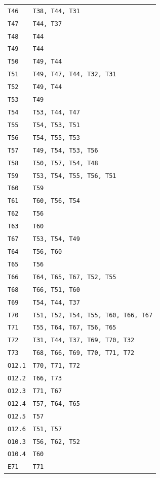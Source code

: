 \begin{longtable}{@{}p{14mm}p{108mm}@{}}
\texttt{T46} & \texttt{T38, T44, T31} \\
\texttt{T47} & \texttt{T44, T37} \\
\texttt{T48} & \texttt{T44} \\
\texttt{T49} & \texttt{T44} \\
\texttt{T50} & \texttt{T49, T44} \\
\texttt{T51} & \texttt{T49, T47, T44, T32, T31} \\
\texttt{T52} & \texttt{T49, T44} \\
\texttt{T53} & \texttt{T49} \\
\texttt{T54} & \texttt{T53, T44, T47} \\
\texttt{T55} & \texttt{T54, T53, T51} \\
\texttt{T56} & \texttt{T54, T55, T53} \\
\texttt{T57} & \texttt{T49, T54, T53, T56} \\
\texttt{T58} & \texttt{T50, T57, T54, T48} \\
\texttt{T59} & \texttt{T53, T54, T55, T56, T51} \\
\texttt{T60} & \texttt{T59} \\
\texttt{T61} & \texttt{T60, T56, T54} \\
\texttt{T62} & \texttt{T56} \\
\texttt{T63} & \texttt{T60} \\
\texttt{T67} & \texttt{T53, T54, T49} \\
\texttt{T64} & \texttt{T56, T60} \\
\texttt{T65} & \texttt{T56} \\
\texttt{T66} & \texttt{T64, T65, T67, T52, T55} \\
\texttt{T68} & \texttt{T66, T51, T60} \\
\texttt{T69} & \texttt{T54, T44, T37} \\
\texttt{T70} & \texttt{T51, T52, T54, T55, T60, T66, T67} \\
\texttt{T71} & \texttt{T55, T64, T67, T56, T65} \\
\texttt{T72} & \texttt{T31, T44, T37, T69, T70, T32} \\
\texttt{T73} & \texttt{T68, T66, T69, T70, T71, T72} \\
\texttt{O12.1} & \texttt{T70, T71, T72} \\
\texttt{O12.2} & \texttt{T66, T73} \\
\texttt{O12.3} & \texttt{T71, T67} \\
\texttt{O12.4} & \texttt{T57, T64, T65} \\
\texttt{O12.5} & \texttt{T57} \\
\texttt{O12.6} & \texttt{T51, T57} \\
\texttt{O10.3} & \texttt{T56, T62, T52} \\
\texttt{O10.4} & \texttt{T60} \\
\texttt{E71} & \texttt{T71} \\
\bottomrule
\end{longtable}
\normalsize
